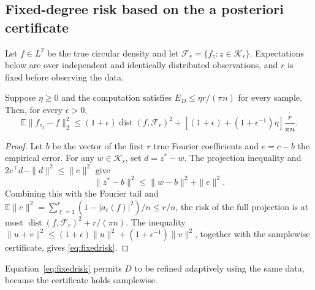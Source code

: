 \subsection{Fixed-degree risk based on the a posteriori certificate}
Let \(f\in L^2\) be the true circular density and let \(\mathcal F_r=\{f_z:z\in\mathcal K_r\}\). Expectations below are over independent and identically distributed observations, and \(r\) is fixed before observing the data.
\begin{proposition}\label{prop:fixedrisk}
Suppose \(\eta\ge0\) and the computation satisfies \(E_D\le\eta r/(\pi n)\) for every sample. Then, for every \(\epsilon>0\),
\begin{equation}\label{eq:fixedrisk}
\mathbb E\|f_{z_I}-f\|_2^2\le(1+\epsilon)\operatorname{dist}(f,\mathcal F_r)^2+
\left[(1+\epsilon)+(1+\epsilon^{-1})\eta\right]\frac{r}{\pi n}.
\end{equation}
\end{proposition}
\begin{proof}
Let \(b\) be the vector of the first \(r\) true Fourier coefficients and \(e=c-b\) the empirical error. For any \(w\in\mathcal K_r\), set \(d=z^*-w\). The projection inequality and \(2e^\top d-\|d\|^2\le\|e\|^2\) give
\[\|z^*-b\|^2\le\|w-b\|^2+\|e\|^2.\]
Combining this with the Fourier tail and \(\mathbb E\|e\|^2=\sum_{\ell=1}^r(1-|a_\ell(f)|^2)/n\le r/n\), the risk of the full projection is at most \(\operatorname{dist}(f,\mathcal F_r)^2+r/(\pi n)\). The inequality \(\|u+v\|^2\le(1+\epsilon)\|u\|^2+(1+\epsilon^{-1})\|v\|^2\), together with the samplewise certificate, gives \eqref{eq:fixedrisk}.
\end{proof}
Equation~\eqref{eq:fixedrisk} permits \(D\) to be refined adaptively using the same data, because the certificate holds samplewise.

